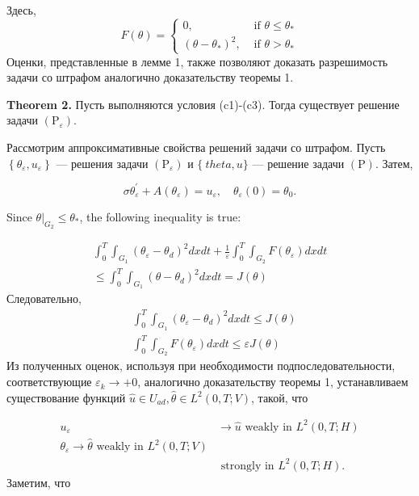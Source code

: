 \documentclass[10pt]{article}
\begin{document}
Здесь,
\[
F(\theta)= \begin{cases}0, & \text { if } \theta \leq \theta_{*} \\
\left(\theta-\theta_{*}\right)^{2}, & \text { if } \theta>\theta_{*}\end{cases}
\]
Оценки, представленные в лемме 1, также позволяют доказать разрешимость
задачи со штрафом аналогично доказательству теоремы 1.

\textbf{Theorem 2.}
Пусть выполняются условия (c1)-(c3).
Тогда существует решение задачи $\left(\mathrm{P}_{\varepsilon}\right)$.

Рассмотрим аппроксимативные свойства решений задачи со штрафом.
Пусть $\left\{\theta_{\varepsilon}, u_{\varepsilon}\right\}$ — решения задачи
$\left(\mathrm{P}_{\varepsilon}\right)$ и $\{\ theta, u\}$
— решение задачи $(\mathrm{P})$.
Затем,

\[
\sigma \theta_{\varepsilon}^{\prime}+A\left(\theta_{\varepsilon}\right)=u_{\varepsilon},
\quad \theta_{\varepsilon}(0)=\theta_{0} .
\]

Since $\left.\theta\right|_{G_{2}} \leq \theta_{*}$, the following inequality is true:

\[
\begin{array}{r}
\int_{0}^{T} \int_{G_{1}}\left(\theta_{\varepsilon}-\theta_{d}\right)^{2} d x d t+\frac{1}{\varepsilon}
\int_{0}^{T} \int_{G_{2}} F\left(\theta_{\varepsilon}\right) d x d t \\
\leq \int_{0}^{T} \int_{G_{1}}\left(\theta-\theta_{d}\right)^{2} d x d t=J(\theta)
\end{array}
\]
Следовательно,
\[
\begin{aligned}
&\int_{0}^{T} \int_{G_{1}}\left(\theta_{\varepsilon}-\theta_{d}\right)^{2} d x d t \leq J(\theta) \\
&\int_{0}^{T} \int_{G_{2}} F\left(\theta_{\varepsilon}\right) d x d t \leq \varepsilon J(\theta)
\end{aligned}
\]
Из полученных оценок, используя при необходимости подпоследовательности,
соответствующие $\varepsilon_{k} \rightarrow+0$,
аналогично доказательству теоремы 1, устанавливаем существование
функций $\widehat{u} \in U_{a d}, \widehat{\theta} \in L^{2}(0, T ; V)$, такой, что

\[
\begin{aligned}
u_{\varepsilon} & \rightarrow \widehat{u} \text { weakly in } L^{2}(0, T ; H) \\
\theta_{\varepsilon} \rightarrow \widehat{\theta} \text { weakly in } L^{2}(0, T ; V) \\
& \text { strongly in } L^{2}(0, T ; H) .
\end{aligned}
\]
Заметим, что
\end{document}
